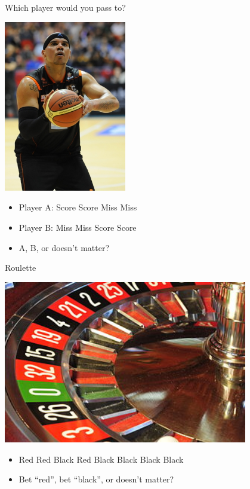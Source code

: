 \documentclass{beamer}
\begin{document}
\begin{frame}{Which player would you pass to?}
\centerline{\includegraphics[width=0.4\textwidth]{pics/basketball.jpg}}
\begin{itemize}
\item Player A: Score Score Miss Miss
\item Player B: Miss Miss Score Score
\item A, B, or doesn't matter?
\end{itemize}
\end{frame}

\begin{frame}{Roulette}
\centerline{\includegraphics[width=0.8\textwidth]{pics/roulette.jpg}}
\begin{itemize}
\item Red Red Black Red Black Black Black Black 
\item Bet ``red'', bet ``black'', or doesn't matter?
\end{itemize}
\end{frame}
\end{document}
